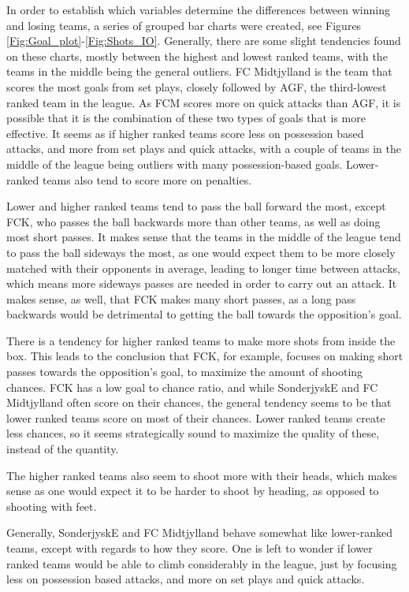 In order to establish which variables determine the differences between
winning and losing teams, a series of grouped bar charts were created, see
Figures \ref{Fig:Goal_plot}-\ref{Fig:Shots_IO}.
Generally, there are some slight tendencies found on these charts, mostly between the highest and lowest ranked teams, with the teams in the middle being the general outliers. 
FC Midtjylland is the team that scores the most goals from set plays, closely followed by AGF, the third-lowest ranked team in the league. As FCM scores more on quick attacks than AGF, it is possible that it is the combination of these two types of goals that is more effective. It seems as if higher ranked teams score less on possession based attacks, and more from set plays and quick attacks, with a couple of teams in the middle of the league being outliers with many possession-based goals. Lower-ranked teams also tend to score more on penalties. 

Lower and higher ranked teams tend to pass the ball forward the most, except FCK, who passes the ball backwards more than other teams, as well as doing most short passes. It makes sense that the teams in the middle of the league tend to pass the ball sideways the most, as one would expect them to be more closely matched with their opponents in average, leading to longer time between attacks, which means more sideways passes are needed in order to carry out an attack. It makes sense, as well, that FCK makes many short passes, as a long pass backwards would be detrimental to getting the ball towards the opposition's goal. 

There is a tendency for higher ranked teams to make more shots from inside the box. This leads to the conclusion that FCK, for example, focuses on making short passes towards the opposition's goal, to maximize the amount of shooting chances. FCK has a low goal to chance ratio, and while SonderjyskE and FC Midtjylland often score on their chances, the general tendency seems to be that lower ranked teams score on most of their chances. Lower ranked teams create less chances, so it seems strategically sound to maximize the quality of these, instead of the quantity. 

The higher ranked teams also seem to shoot more with their heads, which makes sense as one would expect it to be harder to shoot by heading, as opposed to shooting with feet. 

Generally, SonderjyskE and FC Midtjylland behave somewhat like lower-ranked teams, except with regards to how they score. One is left to wonder if lower ranked teams would be able to climb considerably in the league, just by focusing less on possession based attacks, and more on set plays and quick attacks. 
